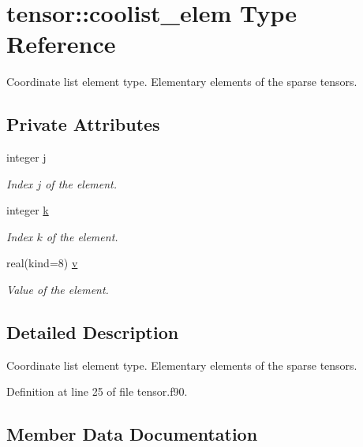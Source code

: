 \hypertarget{structtensor_1_1coolist__elem}{}\section{tensor\+:\+:coolist\+\_\+elem Type Reference}
\label{structtensor_1_1coolist__elem}


Coordinate list element type. Elementary elements of the sparse tensors.  


\subsection*{Private Attributes}
\begin{DoxyCompactItemize}
\item 
integer \hyperlink{structtensor_1_1coolist__elem_a0ed51fd9ddc1c2168d8c138eb5da5f66}{j}
\begin{DoxyCompactList}\small\item\em Index $j$ of the element. \end{DoxyCompactList}\item 
integer \hyperlink{structtensor_1_1coolist__elem_a368c80ca537d7c5d6e1fbba8a85dec38}{k}
\begin{DoxyCompactList}\small\item\em Index $k$ of the element. \end{DoxyCompactList}\item 
real(kind=8) \hyperlink{structtensor_1_1coolist__elem_ac569057f08f5f8ea171b87aa7b9dd428}{v}
\begin{DoxyCompactList}\small\item\em Value of the element. \end{DoxyCompactList}\end{DoxyCompactItemize}


\subsection{Detailed Description}
Coordinate list element type. Elementary elements of the sparse tensors. 

Definition at line 25 of file tensor.\+f90.



\subsection{Member Data Documentation}
